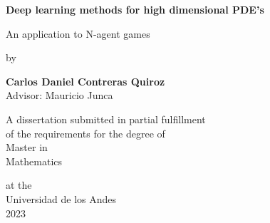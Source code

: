 \begin{titlepage}
    \begin{center}
        \vspace*{1cm}
        
        \Huge
        \textbf{Deep learning methods for high dimensional PDE's}
        
        \vspace{0.5cm}
        \LARGE
        An application to N-agent games\\
        \vspace{0.5cm}
   
        by\\
        \vspace{0.5cm}
    
        \textbf{Carlos Daniel Contreras Quiroz}\\
        \vspace*{1cm}
        Advisor: Mauricio Junca
        
        \vfill
        
        A dissertation submitted in partial fulfillment\\
        of the requirements for the degree of\\
        Master in\\
        Mathematics\\
    
        
        \vspace{1.8cm}

        
        \Large
        at the\\Universidad de los Andes\\
        2023\\
        \vspace{1.0cm}
       
        
    \end{center}
    
\end{titlepage}
